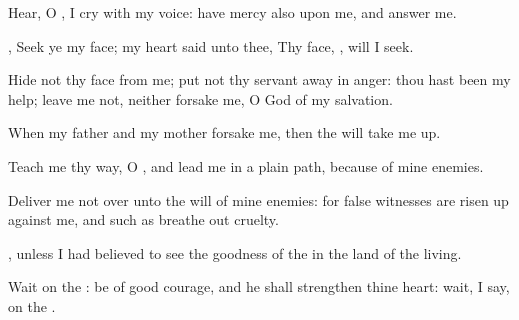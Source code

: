 {\Q {}Hear, O
{},
{} I
cry with my
voice: have
mercy also upon me, and
answer me.


\par }{\Q {},
Seek ye my
face; my
heart
said unto thee, Thy
face,
{}, will I
seek.


\par }{\Q {}Hide not thy
face
{} from me;
put not thy
servant
away in
anger: thou hast been my
help;
leave me not, neither
forsake me, O
God of my
salvation.


\par }{\Q {}When my
father and my
mother
forsake me, then the
{} will take me
up.


\par }{\Q {}Teach me thy
way, O
{}, and
lead me in a
plain
path, because of mine
enemies.


\par }{\Q {}Deliver me not over unto the
will of mine
enemies: for
false
witnesses are risen
up against me, and such as breathe
out
cruelty.


\par }{\Q {},
unless I had
believed to
see the
goodness of the
{} in the
land of the
living.


\par }{\Q {}Wait on the
{}: be of good
courage, and he shall
strengthen thine
heart:
wait, I say, on the
{}.




\par }
